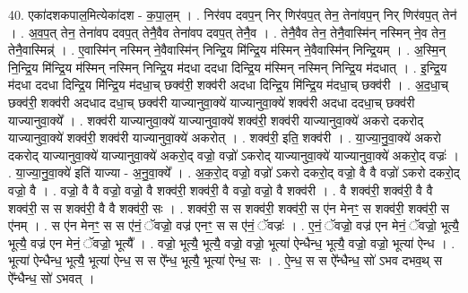 \documentclass[17pt]{extarticle}
\begin{document}
40. एका॑दशकपाल॒मित्येका॑दश - क॒पा॒ल॒म् । . निर॑वप दवप॒न् निर् णिर॑वप॒त् तेन॒ तेना॑वप॒न् निर् णिर॑वप॒त् तेन॑ । . अ॒व॒प॒त् तेन॒ तेना॑वप दवप॒त् तेनै॒वैव तेना॑वप दवप॒त् तेनै॒व । . तेनै॒वैव तेन॒ तेनै॒वास्मि॑न् नस्मिन् ने॒व तेन॒ तेनै॒वास्मिन्न्॑ । . ए॒वास्मि॑न् नस्मिन् ने॒वैवास्मि॑न् निन्द्रि॒य मि॑न्द्रि॒य म॑स्मिन् ने॒वैवास्मि॑न् निन्द्रि॒यम् । . अ॒स्मि॒न् नि॒न्द्रि॒य मि॑न्द्रि॒य म॑स्मिन् नस्मिन् निन्द्रि॒य म॑दधा ददधा दिन्द्रि॒य म॑स्मिन् नस्मिन् निन्द्रि॒य म॑दधात् । . इ॒न्द्रि॒य म॑दधा ददधा दिन्द्रि॒य मि॑न्द्रि॒य म॑दधा॒च् छक्व॑री॒ शक्व॑री अदधा दिन्द्रि॒य मि॑न्द्रि॒य म॑दधा॒च् छक्व॑री । . अ॒द॒धा॒च् छक्व॑री॒ शक्व॑री अदधाद दधा॒च् छक्व॑री याज्यानुवा॒क्ये॑ याज्यानुवा॒क्ये॑ शक्व॑री अदधा ददधा॒च् छक्व॑री याज्यानुवा॒क्ये᳚ । . शक्व॑री याज्यानुवा॒क्ये॑ याज्यानुवा॒क्ये॑ शक्व॑री॒ शक्व॑री याज्यानुवा॒क्ये॑ अकरो दकरोद् याज्यानुवा॒क्ये॑ शक्व॑री॒ शक्व॑री याज्यानुवा॒क्ये॑ अकरोत् । . शक्व॑री॒ इति॒ शक्व॑री । . या॒ज्या॒नु॒वा॒क्ये॑ अकरो दकरोद् याज्यानुवा॒क्ये॑ याज्यानुवा॒क्ये॑ अकरो॒द् वज्रो॒ वज्रो॑ ऽकरोद् याज्यानुवा॒क्ये॑ याज्यानुवा॒क्ये॑ अकरो॒द् वज्रः॑ । . या॒ज्या॒नु॒वा॒क्ये॑ इति॑ याज्या - अ॒नु॒वा॒क्ये᳚ । . अ॒क॒रो॒द् वज्रो॒ वज्रो॑ ऽकरो दकरो॒द् वज्रो॒ वै वै वज्रो॑ ऽकरो दकरो॒द् वज्रो॒ वै । . वज्रो॒ वै वै वज्रो॒ वज्रो॒ वै शक्व॑री॒ शक्व॑री॒ वै वज्रो॒ वज्रो॒ वै शक्व॑री । . वै शक्व॑री॒ शक्व॑री॒ वै वै शक्व॑री॒ स स शक्व॑री॒ वै वै शक्व॑री॒ सः । . शक्व॑री॒ स स शक्व॑री॒ शक्व॑री॒ स ए॑न मेनꣳ॒॒ स शक्व॑री॒ शक्व॑री॒ स ए॑नम् । . स ए॑न मेनꣳ॒॒ स स ए॑नं॒ ॅवज्रो॒ वज्र॑ एनꣳ॒॒ स स ए॑नं॒ ॅवज्रः॑ । . ए॒नं॒ ॅवज्रो॒ वज्र॑ एन मेनं॒ ॅवज्रो॒ भूत्यै॒ भूत्यै॒ वज्र॑ एन मेनं॒ ॅवज्रो॒ भूत्यै᳚ । . वज्रो॒ भूत्यै॒ भूत्यै॒ वज्रो॒ वज्रो॒ भूत्या॑ ऐन्धैन्ध॒ भूत्यै॒ वज्रो॒ वज्रो॒ भूत्या॑ ऐन्ध । . भूत्या॑ ऐन्धैन्ध॒ भूत्यै॒ भूत्या॑ ऐन्ध॒ स स ऐ᳚न्ध॒ भूत्यै॒ भूत्या॑ ऐन्ध॒ सः । . ऐ॒न्ध॒ स स ऐ᳚न्धैन्ध॒ सो॑ ऽभव दभव॒थ् स ऐ᳚न्धैन्ध॒ सो॑ ऽभवत् । \newline
\pagebreak
{}
\end{document}
